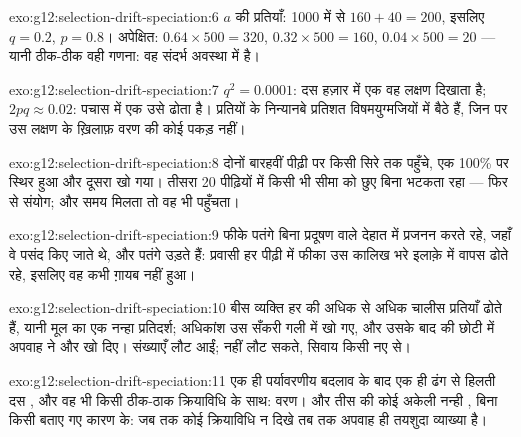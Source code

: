 \begin{solution}{exo:g12:selection-drift-speciation:6}
$a$ की प्रतियाँ: 1000 में से $160 + 40 = 200$, इसलिए $q = 0.2$, $p = 0.8$।
अपेक्षित: $0.64 \times 500 = 320$, $0.32 \times 500 = 160$, $0.04
\times 500 = 20$ --- यानी ठीक-ठीक वही गणना: वह  संदर्भ अवस्था में
है।
\end{solution}

\begin{solution}{exo:g12:selection-drift-speciation:7}
$q^2 = 0.0001$: दस हज़ार में एक वह लक्षण दिखाता है; $2pq \approx
0.02$: पचास में एक उसे ढोता है। प्रतियों के निन्यानबे प्रतिशत
विषमयुग्मजियों में बैठे हैं, जिन पर उस लक्षण के ख़िलाफ़ वरण की कोई पकड़ नहीं।
\end{solution}

\begin{solution}{exo:g12:selection-drift-speciation:8}
दोनों बारहवीं पीढ़ी पर किसी सिरे तक पहुँचे, एक 100\% पर स्थिर हुआ और दूसरा
खो गया। तीसरा 20 पीढ़ियों में किसी भी सीमा को छुए बिना भटकता रहा --- फिर से
संयोग; और समय मिलता तो वह भी पहुँचता।
\end{solution}

\begin{solution}{exo:g12:selection-drift-speciation:9}
फीके पतंगे बिना प्रदूषण वाले देहात में प्रजनन करते रहे, जहाँ वे पसंद किए
जाते थे, और पतंगे उड़ते हैं: प्रवासी हर पीढ़ी में फीका  उस
कालिख भरे इलाक़े में वापस ढोते रहे, इसलिए वह कभी ग़ायब नहीं हुआ।
\end{solution}

\begin{solution}{exo:g12:selection-drift-speciation:10}
बीस व्यक्ति हर  की अधिक से अधिक चालीस प्रतियाँ ढोते हैं, यानी मूल
 का एक नन्हा प्रतिदर्श; अधिकांश उस सँकरी गली में खो गए, और
उसके बाद की छोटी  में अपवाह ने और खो दिए। संख्याएँ लौट आईं;
 नहीं लौट सकते, सिवाय किसी नए  से।
\end{solution}

\begin{solution}{exo:g12:selection-drift-speciation:11}
एक ही पर्यावरणीय बदलाव के बाद एक ही ढंग से हिलती दस , और वह भी किसी
ठीक-ठाक क्रियाविधि के साथ: वरण। और तीस की कोई अकेली नन्ही , बिना किसी
बताए गए कारण के: जब तक कोई क्रियाविधि न दिखे तब तक अपवाह ही तयशुदा
व्याख्या है।
\end{solution}

